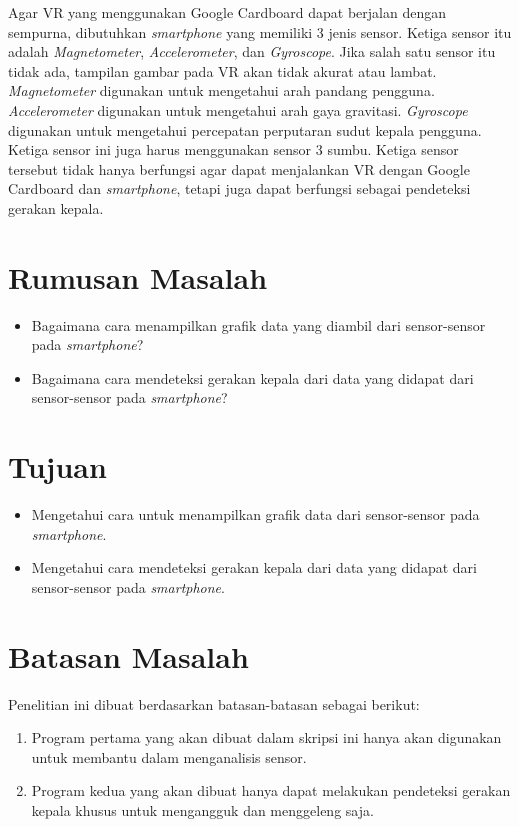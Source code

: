 Agar VR yang menggunakan Google Cardboard dapat berjalan dengan sempurna, dibutuhkan \textit{smartphone} yang memiliki 3 jenis sensor. Ketiga sensor itu adalah \textit{Magnetometer}, \textit{Accelerometer}, dan \textit{Gyroscope}.\cite{android_open_source_project} Jika salah satu sensor itu tidak ada, tampilan gambar pada VR akan tidak akurat atau lambat. \textit{Magnetometer} digunakan untuk mengetahui arah pandang pengguna. \textit{Accelerometer} digunakan untuk mengetahui arah gaya gravitasi.\cite{bleser2009advanced} \textit{Gyroscope} digunakan untuk mengetahui percepatan perputaran sudut kepala pengguna. Ketiga sensor ini juga harus menggunakan sensor 3 sumbu. Ketiga sensor tersebut tidak hanya berfungsi agar dapat menjalankan VR dengan Google Cardboard dan \textit{smartphone}, tetapi juga dapat berfungsi sebagai pendeteksi gerakan kepala.
\section{Rumusan Masalah}

\begin{itemize}
	\item Bagaimana cara menampilkan grafik data yang diambil dari sensor-sensor pada \textit{smartphone}?
	\item Bagaimana cara mendeteksi gerakan kepala dari data yang didapat dari sensor-sensor pada \textit{smartphone}?
\end{itemize}

\section{Tujuan}

\begin{itemize}
	\item Mengetahui cara untuk menampilkan grafik data dari sensor-sensor pada \textit{smartphone}.
	\item Mengetahui cara mendeteksi gerakan kepala dari data yang didapat dari sensor-sensor pada \textit{smartphone}.
\end{itemize}

\section{Batasan Masalah}

Penelitian ini dibuat berdasarkan batasan-batasan sebagai berikut: 
\begin{enumerate}
	\item Program pertama yang akan dibuat dalam skripsi ini hanya akan digunakan untuk membantu dalam menganalisis sensor.
	\item Program kedua yang akan dibuat hanya dapat melakukan pendeteksi gerakan kepala khusus untuk mengangguk dan menggeleng saja.
\end{enumerate}


